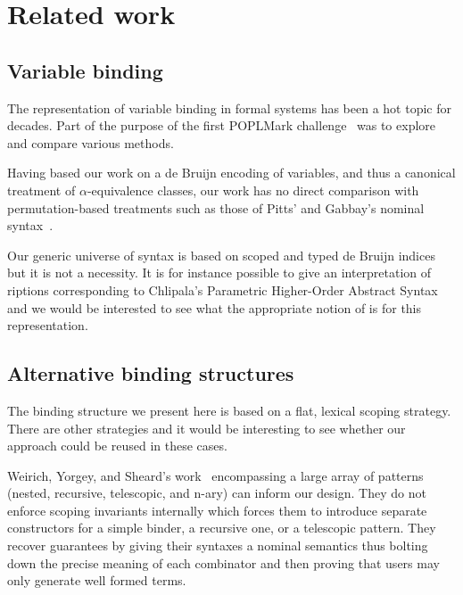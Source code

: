 


\section{Related work}\label{section:related-work}

\subsection{Variable binding} The representation of variable binding
in formal systems has been a hot topic for decades. Part of the purpose
of the first POPLMark challenge~\citeyear{poplmark} was to explore and
compare various methods.

Having based our work on a de Bruijn encoding of variables, and thus a
canonical treatment of \(\alpha\)-equivalence classes, our work has no
direct comparison with permutation-based treatments such as those of
Pitts' and Gabbay's nominal syntax~\citeyear{gabbay:newaas-jv}.

Our generic universe of syntax is based on
scoped and typed de Bruijn indices~\cite{de1972lambda} but it is not
a necessity. It is for instance possible to give an interpretation
of riptions corresponding to Chlipala's Parametric Higher-Order
Abstract Syntax~\citeyear{DBLP:conf/icfp/Chlipala08} and we would be interested
to see what the appropriate notion of  is for this representation.

\subsection{Alternative binding structures} The binding structure we
present here is based on a flat, lexical scoping strategy. There are
other strategies and it would be interesting to see whether
our approach could be reused in these cases.

Weirich, Yorgey, and Sheard's work~\citeyear{DBLP:conf/icfp/WeirichYS11}
encompassing a large array of patterns (nested, recursive, telescopic, and
n-ary) can inform our design. They do not enforce scoping invariants internally
which forces them to introduce separate constructors for a simple binder, a
recursive one, or a telescopic pattern. They recover guarantees by giving
their syntaxes a nominal semantics thus bolting down the precise meaning of
each combinator and then proving that users may only generate well formed
terms.

